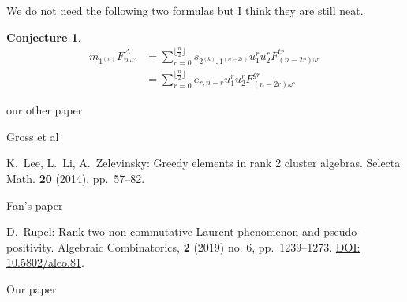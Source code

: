 \documentclass{amsart}
\newtheorem{conjecture}[theorem]{Conjecture}
\numberwithin{theorem}{section}
\begin{document}
  We do not need the following two formulas but I think they are still neat.
  \begin{conjecture}
    \begin{align*} 
      m_{1^{(n)}} F_{n\omega^\circ}^\Delta
      &=
      \sum_{r=0}^{\lfloor \frac{n}{2} \rfloor}
      s_{2^{(k)},1^{(n-2r)}}
      u_1^r u_2^r
      F_{(n-2r)\omega^\circ}^{tr}
      \\&=
      \sum_{r=0}^{\lfloor \frac{n}{2} \rfloor}
      e_{r,n-r}
      u_1^r u_2^r
      F_{(n-2r)\omega^\circ}^{gr}
    \end{align*}
  \end{conjecture}

  \begin{thebibliography}{XXX}
      our other paper

      Gross et al

      K.~Lee, L.~Li, A.~Zelevinsky: Greedy elements in rank 2 cluster algebras. Selecta Math. \textbf{20} (2014), pp.~57--82.

      Fan's paper

      D.~Rupel: Rank two non-commutative Laurent phenomenon and pseudo-positivity.  Algebraic Combinatorics, \textbf{2} (2019) no. 6, pp.~1239--1273. \href{https://doi.org/10.5802/alco.81}{DOI: 10.5802/alco.81}.

      Our paper
  \end{thebibliography}


  
\end{document}
